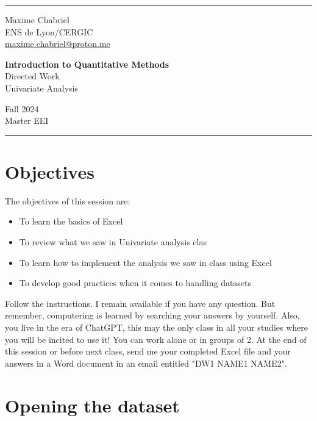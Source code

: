 \documentclass{article}
\makeatletter
\def\author{Maxime Chabriel} \def\instit{ENS de Lyon/CERGIC} \def\email{maxime.chabriel@proton.me}
\makeatother
\begin{document}
	\par\noindent\rule{\textwidth}{1pt}
	\begin{minipage}[c]{.32\linewidth}
		\vspace{0.5cm}
		\small{ \author \\
			\instit \\
			\href{mailto:\email}{\email} \\
		}
	\end{minipage}
	\begin{minipage}[c]{.33\linewidth}
		\begin{center}
			\large{\textbf{Introduction to Quantitative Methods}} \\
			\normalsize{Directed Work \\ Univariate Analysis}
		\end{center}
	\end{minipage}
	\begin{minipage}[c]{.32\linewidth}
		\raggedleft
		\small{ Fall 2024 \\
			Master EEI \\
		}
	\end{minipage}
	\par\noindent\rule{\textwidth}{1pt}
	
	\section*{Objectives}

    The objectives of this session are:
    \begin{itemize}
        \item To learn the basics of Excel
        \item To review what we saw in Univariate analysis clas
        \item To learn how to implement the analysis we saw in class using Excel
        \item To develop good practices when it comes to handling datasets
    \end{itemize}
    Follow the instructions. I remain available if you have any question. But remember, computering is learned by searching your answers by yourself. Also, you live in the era of ChatGPT, this may the only class in all your studies where you will be incited to use it! You can work alone or in groups of 2. At the end of this session or before next class, send me your completed Excel file and your answers in a Word document in an email entitled "DW1 NAME1 NAME2".

    \section*{Opening the dataset}
\end{document}
